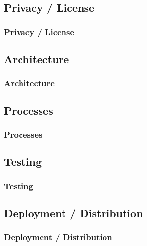 \begin{frame}
    \subsection{Privacy / License}\label{ch:privacy-and-license}
    \frametitle{Privacy / License}
\end{frame}

\begin{frame}
    \subsection{Architecture}\label{ch:architecture}
    \frametitle{Architecture}
\end{frame}

\begin{frame}
    \subsection{Processes}\label{ch:processes}
    \frametitle{Processes}
\end{frame}

\begin{frame}
    \subsection{Testing}\label{ch:testing}
    \frametitle{Testing}
\end{frame}

\begin{frame}
    \subsection{Deployment / Distribution}\label{ch:deployment-and-distribution}
    \frametitle{Deployment / Distribution}
\end{frame}
